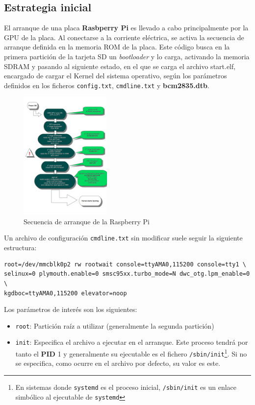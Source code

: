 \documentclass{article}
\begin{document}
\subsection{Estrategia inicial}

El arranque de una placa \textbf{Rasbperry Pi} es llevado a cabo principalmente por la GPU de la placa. Al conectarse a la corriente eléctrica, se activa la secuencia de arranque definida en la memoria ROM de la placa. Este código busca en la primera partición de la tarjeta SD un \textit{bootloader} y lo carga, activando la memoria SDRAM y pasando al siguiente estado, en el que se carga el archivo start.elf, encargado de cargar el Kernel del sistema operativo, según los parámetros definidos en los ficheros \texttt{config.txt}, \texttt{cmdline.txt} y \textbf{bcm2835.dtb}.

\begin{figure}[H]
	\centering
	\includegraphics[width=0.4\textwidth]{bootsequence}
	\caption{Secuencia de arranque de la Raspberry Pi\cite{bootsequence}}
	\label{bootsequence}
\end{figure}

Un archivo de configuración \texttt{cmdline.txt} sin modificar suele seguir la siguiente estructura:

\begin{lstlisting}[frame=single,basicstyle=\small\ttfamily]
root=/dev/mmcblk0p2 rw rootwait console=ttyAMA0,115200 console=tty1 \
selinux=0 plymouth.enable=0 smsc95xx.turbo_mode=N dwc_otg.lpm_enable=0 \
kgdboc=ttyAMA0,115200 elevator=noop
\end{lstlisting}

Los parámetros de interés son los siguientes:

\begin{itemize}
	\item \texttt{root}: Partición raíz a utilizar (generalmente la segunda partición)
	\item \texttt{init}: Especifica el archivo a ejecutar en el arranque. Este proceso tendrá por tanto el \textbf{PID} 1 y generalmente su ejecutable es el fichero \texttt{/sbin/init}\footnote{En sistemas donde \texttt{systemd} es el proceso inicial, \texttt{/sbin/init} es un enlace simbólico al ejecutable de \texttt{systemd}}. Si no se especifica, como ocurre en el archivo por defecto, su valor es este\cite{kernelparams:init}.
\end{itemize}
\end{document}
